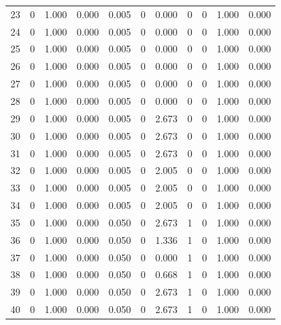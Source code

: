 \begin{tabular}{rrrrrrrrrrr}
23 & 0 & 1.000 & 0.000 & 0.005 & 0 & 0.000 & 0 & 0 & 1.000 & 0.000 \\
24 & 0 & 1.000 & 0.000 & 0.005 & 0 & 0.000 & 0 & 0 & 1.000 & 0.000 \\
25 & 0 & 1.000 & 0.000 & 0.005 & 0 & 0.000 & 0 & 0 & 1.000 & 0.000 \\
26 & 0 & 1.000 & 0.000 & 0.005 & 0 & 0.000 & 0 & 0 & 1.000 & 0.000 \\
27 & 0 & 1.000 & 0.000 & 0.005 & 0 & 0.000 & 0 & 0 & 1.000 & 0.000 \\
28 & 0 & 1.000 & 0.000 & 0.005 & 0 & 0.000 & 0 & 0 & 1.000 & 0.000 \\
29 & 0 & 1.000 & 0.000 & 0.005 & 0 & 2.673 & 0 & 0 & 1.000 & 0.000 \\
30 & 0 & 1.000 & 0.000 & 0.005 & 0 & 2.673 & 0 & 0 & 1.000 & 0.000 \\
31 & 0 & 1.000 & 0.000 & 0.005 & 0 & 2.673 & 0 & 0 & 1.000 & 0.000 \\
32 & 0 & 1.000 & 0.000 & 0.005 & 0 & 2.005 & 0 & 0 & 1.000 & 0.000 \\
33 & 0 & 1.000 & 0.000 & 0.005 & 0 & 2.005 & 0 & 0 & 1.000 & 0.000 \\
34 & 0 & 1.000 & 0.000 & 0.005 & 0 & 2.005 & 0 & 0 & 1.000 & 0.000 \\
35 & 0 & 1.000 & 0.000 & 0.050 & 0 & 2.673 & 1 & 0 & 1.000 & 0.000 \\
36 & 0 & 1.000 & 0.000 & 0.050 & 0 & 1.336 & 1 & 0 & 1.000 & 0.000 \\
37 & 0 & 1.000 & 0.000 & 0.050 & 0 & 0.000 & 1 & 0 & 1.000 & 0.000 \\
38 & 0 & 1.000 & 0.000 & 0.050 & 0 & 0.668 & 1 & 0 & 1.000 & 0.000 \\
39 & 0 & 1.000 & 0.000 & 0.050 & 0 & 2.673 & 1 & 0 & 1.000 & 0.000 \\
40 & 0 & 1.000 & 0.000 & 0.050 & 0 & 2.673 & 1 & 0 & 1.000 & 0.000 \\
\bottomrule
\end{tabular}
